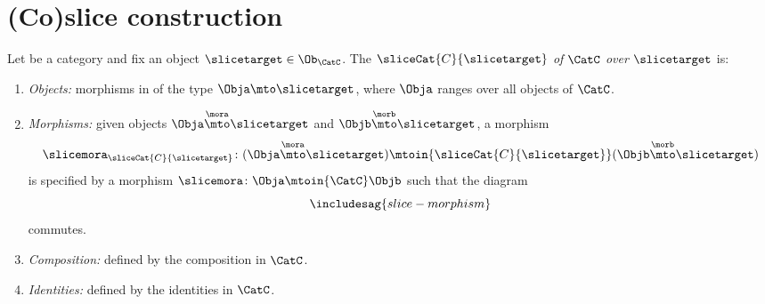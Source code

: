 
\section{(Co)slice construction}


\begin{ctdefinition}
    \label{def:slice-category}

    Let \CatC be a category and fix an object $\slicetarget \in \Ob_\CatC$.
    The  $\sliceCat{C}{\slicetarget}$ \emph{of} $\CatC$ \emph{over} $\slicetarget$ is:
    \begin{enumerate}
        \item \emph{Objects:} morphisms in \CatC of the type $\Obja \mto \slicetarget$, where $\Obja$ ranges over all objects of $\CatC$.
        \item \emph{Morphisms:} given objects $\Obja \overset{\mora}{\mto} \slicetarget$ and $\Objb \overset{\morb}{\mto} \slicetarget$, a morphism
              \begin{equation}
                  \slicemora_{\sliceCat{C}{\slicetarget}} \colon (\Obja \overset{\mora}{\mto} \slicetarget)
                  \mtoin{\sliceCat{C}{\slicetarget}} (\Objb \overset{\morb}{\mto} \slicetarget)
              \end{equation}
              is specified by a morphism $\slicemora \colon \Obja \mtoin{\CatC} \Objb$ such that the diagram
              \begin{equation}\label{eq:slice-morphism}
                  \includesag{slice-morphism}
              \end{equation}
              commutes.

        \item \emph{Composition:} defined by the composition in $\CatC$.
        \item \emph{Identities:} defined by the identities in $\CatC$.
    \end{enumerate}
\end{ctdefinition}

